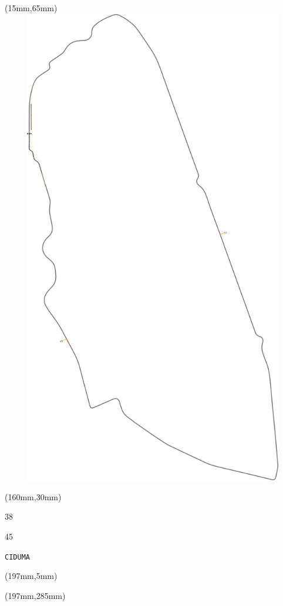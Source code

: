 \begin{textblock*}{185mm}(15mm,65mm)%
\centering
\mbox{\includegraphics[width=185mm,height=210mm,keepaspectratio]{PT/CIDUMA.pdf}}
\end{textblock*}
\begin{textblock*}{40mm}(160mm,30mm)%
\Large
\par{} 
\par38 
\par45 
\par\hfill\tiny\tt CIDUMA\\
\end{textblock*}
\begin{textblock*}{20mm}(197mm,5mm)%
\fbox{\thepage}
\label{CIDUMA}
\end{textblock*}
\begin{textblock*}{20mm}(197mm,285mm)%
\fbox{\thepage}
\end{textblock*}

